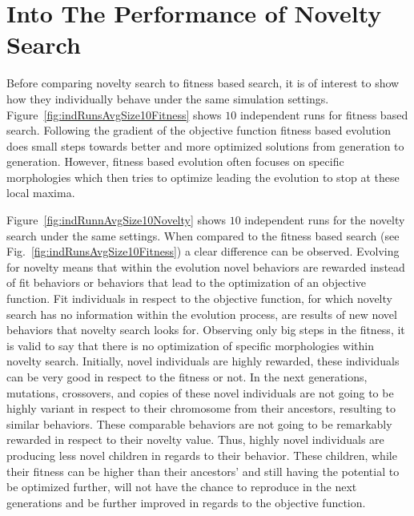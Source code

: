 \section{Into The Performance of Novelty Search}

Before comparing novelty search to fitness based search, it is of interest to show how they individually behave under the same simulation settings. Figure~\ref{fig:indRunsAvgSize10Fitness} shows $10$ independent runs for fitness based search. Following the gradient of the objective function fitness based evolution does small steps towards better and more optimized solutions from generation to generation. However, fitness based evolution often focuses on specific morphologies which then tries to optimize leading the evolution to stop at these local maxima.

Figure~\ref{fig:indRunnAvgSize10Novelty} shows $10$ independent runs for the novelty search under the same settings. When compared to the fitness based search (see Fig.~\ref{fig:indRunsAvgSize10Fitness}) a clear difference can be observed. Evolving for novelty means that within the evolution novel behaviors are rewarded instead of fit behaviors or behaviors that lead to the optimization of an objective function. Fit individuals in respect to the objective function, for which novelty search has no information within the evolution process, are results of new novel behaviors that novelty search looks for. Observing only big steps in the fitness, it is valid to say that there is no optimization of specific morphologies within novelty search. Initially, novel individuals are highly rewarded, these individuals can be very good in respect to the fitness or not. In the next generations, mutations, crossovers, and copies of these novel individuals are not going to be highly variant in respect to their chromosome from their ancestors, resulting to similar behaviors. These comparable behaviors are not going to be remarkably rewarded in respect to their novelty value. Thus, highly novel individuals are producing less novel children in regards to their behavior. These children, while their fitness can be higher than their ancestors' and still having the potential to be optimized further, will not have the chance to reproduce in the next generations and be further improved in regards to the objective function. 

